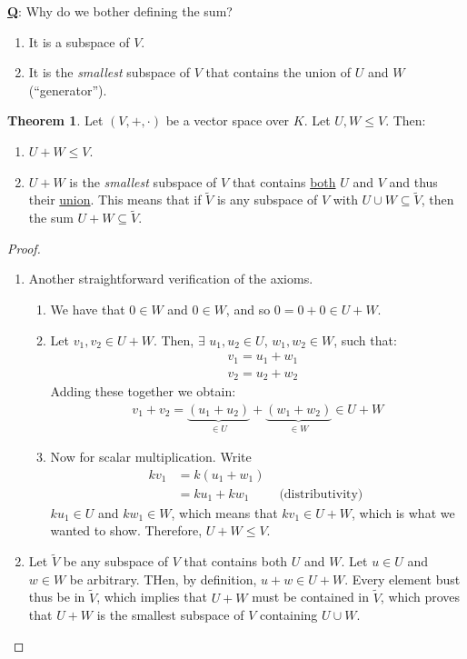 \documentclass[11pt]{scrartcl}
\theoremstyle{definition}
\newtheorem{theorem}{Theorem}
\theoremstyle{remark}
\newcommand{\vsok}[0]{Let $(V, +, \cdot)$ be a vector space over $K$}
\begin{document}
\textbf{\underline{Q}}: Why do we bother defining the sum? 
\begin{enumerate}[noitemsep]
	\item It is a subspace of $V$. 
	\item It is the \emph{smallest} subspace of $V$ that contains the union of $U$ and $W$ (``generator''). 
\end{enumerate}

\begin{theorem}
	\vsok. Let $U, W \leq V$. Then: 
	\begin{enumerate}[noitemsep]
		\item $U + W \leq V$. 
		\item $U+W$ is the \emph{smallest} subspace of $V$ that contains \underline{both} $U$ and $V$ and thus their \underline{union}. This means that if $\widetilde{V}$ is any subspace of $V$ with $U \cup W \subseteq \widetilde{V}$, then the sum $U + W \subseteq \widetilde{V}$. 
	\end{enumerate}
\end{theorem}

\begin{proof}
	\begin{enumerate}[noitemsep]
		\item Another straightforward verification of the axioms. 
		\begin{enumerate}[noitemsep]
			\item We have that $0 \in W$ and $0 \in W$, and so $0 = 0 + 0 \in U +W$. 
			\item Let $v_1, v_2 \in U + W$. Then, $\exists$ $u_1, u_2 \in U$, $w_1, w_2 \in W$, such that: 
			\begin{align*}
				& v_1 = u_1 + w_1 \\
				& v_2 = u_2 + w_2 
			\end{align*}
			Adding these together we obtain: 
			\begin{align*}
					v_1 + v_2 = \underbrace{(u_1 + u_2)}_{\in U} + \underbrace{(w_1 + w_2)}_{\in W} \in U + W 
			\end{align*}
			\item Now for scalar multiplication. Write 
			\begin{align*}
				kv_1 & = k(u_1 + w_1) & \\
					& = k u_1 + k w_1 & \text{ (distributivity) } 
			\end{align*}
			$ku_1 \in U$ and $k w_1 \in W$, which means that $kv_1 \in U+W$, which is what we wanted to show. 
			Therefore, $U+W \leq V$.
		\end{enumerate}
		\item Let $\widetilde{V}$ be any subspace of $V$ that contains both $U$ and $W$. Let $u \in U$ and $w \in W$ be arbitrary. THen, by definition, $u+w \in U+W$. Every element bust thus be in $\widetilde{V}$, which implies that $U+W$ must be contained in $\widetilde{V}$, which proves that $U+W$ is the smallest subspace of $V$ containing $U \cup W$. 
	\end{enumerate}
\end{proof}
\end{document}
